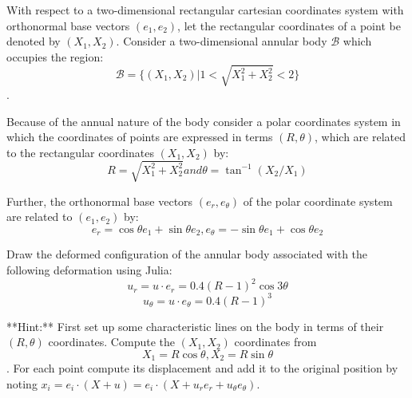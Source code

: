 \documentclass{homework}
\begin{document}
\question  With respect to a two-dimensional rectangular cartesian coordinates system with orthonormal base vectors $(e_{1},e_{2})$, let the rectangular coordinates of a point be denoted by $(X_{1},X_{2})$. Consider a two-dimensional annular body $\mathcal{B}$ which occupies the region:
\[ \mathcal{B}=\{(X_{1},X_{2})|1<\sqrt{X_{1}^{2}+X_{2}^{2}}<2\} \].

Because of the annual nature of the body consider a polar coordinates system in which the coordinates of points are expressed in terms $(R, \theta)$, which are related to the rectangular coordinates $(X_{1},X_{2})$ by:
\[ R=\sqrt{X_{1}^{2}+X_{2}^{2}} and \theta=\tan^{-1}(X_{2}/X_{1}) \]

Further, the orthonormal base vectors $(e_{r},e_{\theta})$ of the polar coordinate system are related to $(e_{1},e_{2})$ by:
$$e_{r}=\cos \theta e_{1}+\sin \theta e_{2}, e_{\theta}=-\sin \theta e_{1}+\cos \theta e_{2}$$

Draw the deformed configuration of the annular body associated with the following deformation using Julia:
\[u_{r}=u\cdot e_{r}=0.4(R-1)^{2}\cos 3\theta  \]
\[ u_{\theta}=u\cdot e_{\theta}=0.4(R-1)^{3} \]

**Hint:**
First set up some characteristic lines on the body in terms of their $(R, \theta)$ coordinates. Compute the $(X_{1},X_{2})$ coordinates from $$X_{1}=R \cos \theta, X_{2}=R \sin \theta$$.
For each point compute its displacement and add it to the original position by noting $x_{i}=e_{i}\cdot(X+u)=e_{i}\cdot(X+u_{r}e_{r}+u_{\theta}e_{\theta})$.
\end{document}
